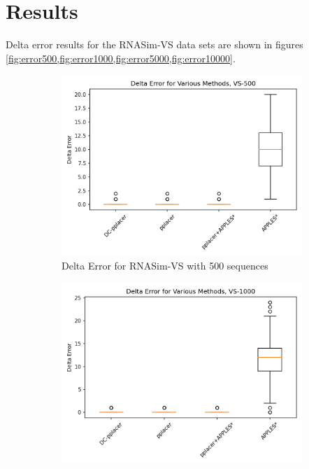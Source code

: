 \documentclass[10pt]{article}
\begin{document}
\section{Results}

Delta error results for the RNASim-VS data sets are shown in figures \ref{fig:error500,fig:error1000,fig:error5000,fig:error10000}.
\begin{figure}[h]
\begin{subfigure}{0.5\textwidth}
\centering
\includegraphics[width=\textwidth]{Figs/VS-delta-error-500-BW.png}
\caption{Delta Error for RNASim-VS with 500 sequences}
\label{fig:error500}
\end{subfigure}
\begin{subfigure}{0.5\textwidth}
\centering
\includegraphics[width=\textwidth]{Figs/VS-delta-error-1000-BW.png}

\end{subfigure}
\end{figure}
\end{document}
